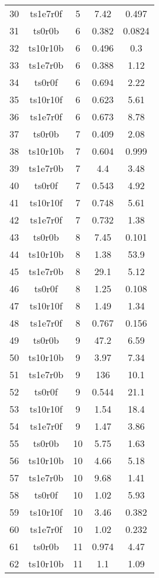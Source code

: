 \begin{table}[hbtp]
\begin{tabular}{|ccccc|}
  30 & ts1e7r0f &    5 & 7.42 & 0.497 \\
  31 & ts0r0b &    6 & 0.382 & 0.0824 \\
  32 & ts10r10b &    6 & 0.496 &  0.3 \\
  33 & ts1e7r0b &    6 & 0.388 & 1.12 \\
  34 & ts0r0f &    6 & 0.694 & 2.22 \\
  35 & ts10r10f &    6 & 0.623 & 5.61 \\
  36 & ts1e7r0f &    6 & 0.673 & 8.78 \\
  37 & ts0r0b &    7 & 0.409 & 2.08 \\
  38 & ts10r10b &    7 & 0.604 & 0.999 \\
  39 & ts1e7r0b &    7 &  4.4 & 3.48 \\
  40 & ts0r0f &    7 & 0.543 & 4.92 \\
  41 & ts10r10f &    7 & 0.748 & 5.61 \\
  42 & ts1e7r0f &    7 & 0.732 & 1.38 \\
  43 & ts0r0b &    8 & 7.45 & 0.101 \\
  44 & ts10r10b &    8 & 1.38 & 53.9 \\
  45 & ts1e7r0b &    8 & 29.1 & 5.12 \\
  46 & ts0r0f &    8 & 1.25 & 0.108 \\
  47 & ts10r10f &    8 & 1.49 & 1.34 \\
  48 & ts1e7r0f &    8 & 0.767 & 0.156 \\
  49 & ts0r0b &    9 & 47.2 & 6.59 \\
  50 & ts10r10b &    9 & 3.97 & 7.34 \\
  51 & ts1e7r0b &    9 &  136 & 10.1 \\
  52 & ts0r0f &    9 & 0.544 & 21.1 \\
  53 & ts10r10f &    9 & 1.54 & 18.4 \\
  54 & ts1e7r0f &    9 & 1.47 & 3.86 \\
  55 & ts0r0b &   10 & 5.75 & 1.63 \\
  56 & ts10r10b &   10 & 4.66 & 5.18 \\
  57 & ts1e7r0b &   10 & 9.68 & 1.41 \\
  58 & ts0r0f &   10 & 1.02 & 5.93 \\
  59 & ts10r10f &   10 & 3.46 & 0.382 \\
  60 & ts1e7r0f &   10 & 1.02 & 0.232 \\
  61 & ts0r0b &   11 & 0.974 & 4.47 \\
  62 & ts10r10b &   11 &  1.1 & 1.09 \\

\end{tabular}
\end{table}
